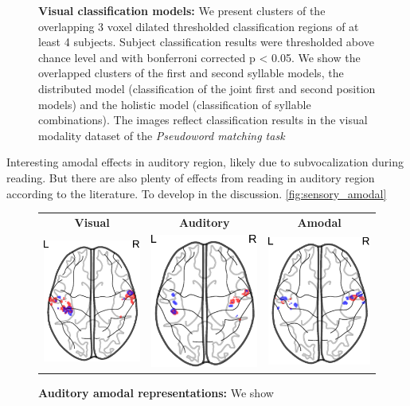 \begin{figure}[ht]
\vspace{3ex}
\caption{\textbf{Visual classification models:} We present clusters of the overlapping 3 voxel dilated thresholded classification regions of at least 4 subjects. Subject classification results were thresholded above chance level and with bonferroni corrected p < 0.05. We show the overlapped clusters of the first and second syllable models, the distributed model (classification of the joint first and second position models) and the holistic model (classification of syllable combinations). The images reflect classification results in the visual modality dataset of the \emph{Pseudoword matching task}}
\label{fig:visual_searchlight}
\end{figure}


Interesting amodal effects in auditory region, likely due to subvocalization during reading. But there are also plenty of effects from reading in auditory region according to the literature. To develop in the discussion.
\ref{fig:sensory_amodal}

\begin{figure}[ht]
\scriptsize
\vspace{5ex}
\hspace{-4ex}
\begin{tabular}{ccc}
\textbf{\Large Visual} & \textbf{\Large Auditory} & \textbf{\Large Amodal}\\
{\includegraphics[width=.18\linewidth]{figures/part_II/searchlight/amodal/auditory_Vis-Vis_segmentation.pdf}}
\hspace{1ex}
&{\includegraphics[width=.18\linewidth]{figures/part_II/searchlight/amodal/auditory_Aud-Aud_segmentation.pdf}}
\hspace{1ex}
&{\includegraphics[width=.18\linewidth]{figures/part_II/searchlight/amodal/auditory_amodal_segmentation.pdf}}
\hspace{1ex}\\
\end{tabular}
\vspace{3ex}
\caption{\textbf{Auditory amodal representations:} We show}
\label{fig:auditory_amodal}
\end{figure}



